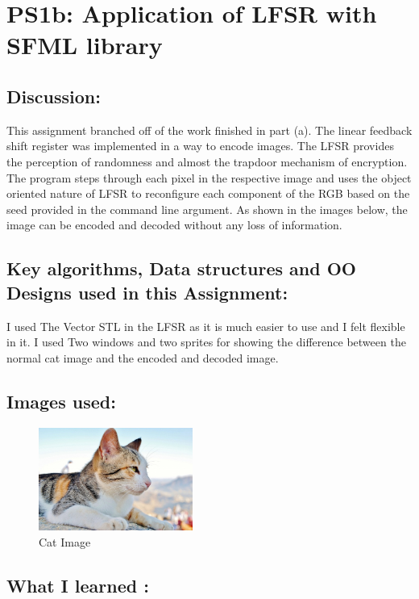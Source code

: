 \section{PS1b: Application of LFSR with SFML library}\label{sec:ps1b}
\graphicspath{{ps1b}}
\subsection{Discussion:}\label{sec:ps1b:disc}
This assignment branched off of the work finished in part (a). The linear feedback shift register was implemented in a way to encode images. The LFSR provides the perception of randomness and almost the trapdoor mechanism of encryption. The program steps through each pixel in the respective image and uses the object oriented nature of LFSR to reconfigure each component of the RGB based on the seed provided in the command line argument. As shown in the images below, the image can be encoded and decoded without any loss of information. 
    
\subsection{Key algorithms, Data structures and OO Designs used in this Assignment:}\label{sec:ps1b:kdo}

I used The Vector STL in the LFSR as it is much easier to use and I felt flexible in it. I used Two windows and two sprites for showing the difference between the normal cat image and the encoded and decoded image. 
 

\subsection{Images used:}\label{sec:ps1b:img}
\begin{figure}[h]
    \centering
    \includegraphics[width=0.45\textwidth]{projectPictures/cat.png}
    \caption{Cat Image}
    \label{fig:mesh1}
\end{figure}

\subsection{What I learned :}\label{sec:ps1b:learn}

